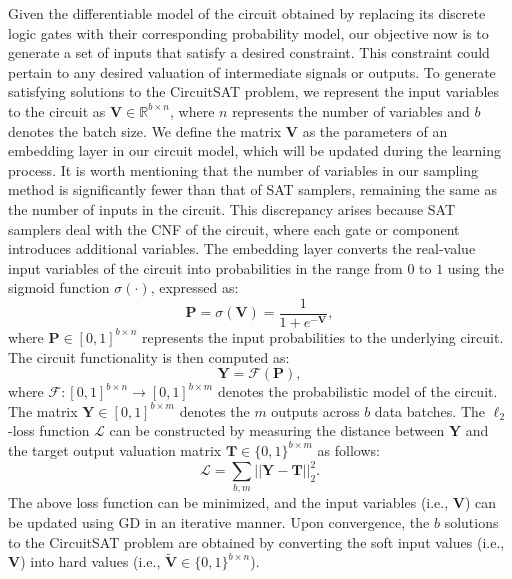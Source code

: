 Given the differentiable model of the circuit obtained by replacing its discrete logic gates with their corresponding probability model, our objective now is to generate a set of inputs that satisfy a desired constraint. This constraint could pertain to any desired valuation of intermediate signals or outputs. To generate satisfying solutions to the CircuitSAT problem, we represent the input variables to the circuit as $\textbf{V} \in \mathbb{R}^{b\times n}$, where $n$ represents the number of variables and $b$ denotes the batch size. We define the matrix $\textbf{V}$ as the parameters of an embedding layer in our circuit model, which will be updated during the learning process. It is worth mentioning that the number of variables in our sampling method is significantly fewer than that of SAT samplers, remaining the same as the number of inputs in the circuit. This discrepancy arises because SAT samplers deal with the CNF of the circuit, where each gate or component introduces additional variables. The embedding layer converts the real-value input variables of the circuit into probabilities in the range from $0$ to $1$ using the sigmoid function $\sigma(\cdot)$, expressed as:
\begin{equation}
    \textbf{P} = \sigma(\textbf{V}) = \dfrac{1}{1 + e^{-\textbf{V}}},
\end{equation}
where $\textbf{P} \in [0, 1]^{b\times n}$ represents the input probabilities to the underlying circuit. The circuit functionality is then computed as:
\begin{equation}
    \textbf{Y} = \mathcal{F}(\textbf{P}),
\end{equation}
where $\mathcal{F}:[0, 1]^{b \times n} \rightarrow [0, 1]^{b \times m}$ denotes the probabilistic model of the circuit. The matrix $\textbf{Y} \in [0, 1]^{b \times m}$ denotes the $m$ outputs across $b$ data batches. The $\ell_2$-loss function $\mathcal{L}$ can be constructed by measuring the distance between $\textbf{Y}$ and the target output valuation matrix $\textbf{T} \in \{0, 1\}^{b \times m}$ as follows:
\begin{equation}
    \mathcal{L} = \sum_{b,m} \left|\left| \textbf{Y} - \textbf{T} \right|\right|^2_2.
\end{equation}
The above loss function can be minimized, and the input variables (i.e., $\textbf{V}$) can be updated using GD in an iterative manner. Upon convergence, the $b$ solutions to the CircuitSAT problem are obtained by converting the soft input values (i.e., $\textbf{V}$) into hard values (i.e., $\widetilde{\textbf{V}} \in \{0, 1\}^{b\times n}$).

